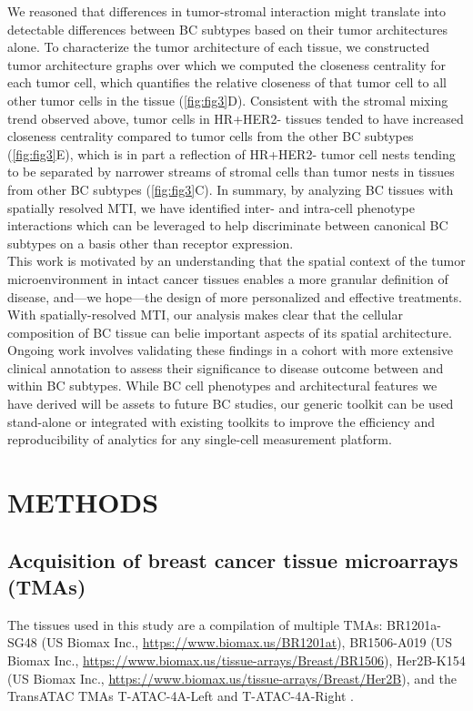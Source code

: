 \documentclass[preprint,review,3p,12pt]{elsarticle}
\begin{document}
We reasoned that differences in tumor-stromal interaction might translate into detectable differences between BC subtypes based on their tumor architectures alone. To characterize the tumor architecture of each tissue, we constructed tumor architecture graphs over which we computed the closeness centrality for each tumor cell, which quantifies the relative closeness of that tumor cell to all other tumor cells in the tissue (\autoref{fig:fig3}D). Consistent with the stromal mixing trend observed above, tumor cells in HR+HER2- tissues tended to have increased closeness centrality compared to tumor cells from the other BC subtypes (\autoref{fig:fig3}E), which is in part a reflection of HR+HER2- tumor cell nests tending to be separated by narrower streams of stromal cells than tumor nests in tissues from other BC subtypes (\autoref{fig:fig3}C). In summary, by analyzing BC tissues with spatially resolved MTI, we have identified inter- and intra-cell phenotype interactions which can be leveraged to help discriminate between canonical BC subtypes on a basis other than receptor expression. \\

This work is motivated by an understanding that the spatial context of the tumor microenvironment in intact cancer tissues enables a more granular definition of disease, and—we hope—the design of more personalized and effective treatments. With spatially-resolved MTI, our analysis makes clear that the cellular composition of BC tissue can belie important aspects of its spatial architecture. Ongoing work involves validating these findings in a cohort with more extensive clinical annotation to assess their significance to disease outcome between and within BC subtypes. While BC cell phenotypes and architectural features we have derived will be assets to future BC studies, our generic toolkit can be used stand-alone or integrated with existing toolkits \cite{histocat2017} to improve the efficiency and reproducibility of analytics for any single-cell measurement platform.

\section{METHODS}
\subsection{Acquisition of breast cancer tissue microarrays (TMAs)}
The tissues used in this study are a compilation of multiple TMAs: BR1201a-SG48 (US Biomax Inc., \url{https://www.biomax.us/BR1201at}), BR1506-A019 (US Biomax Inc., \url{https://www.biomax.us/tissue-arrays/Breast/BR1506}), Her2B-K154 (US Biomax Inc., \url{https://www.biomax.us/tissue-arrays/Breast/Her2B}), and the TransATAC TMAs T-ATAC-4A-Left and T-ATAC-4A-Right \cite{tatac2008}.
\end{document}
